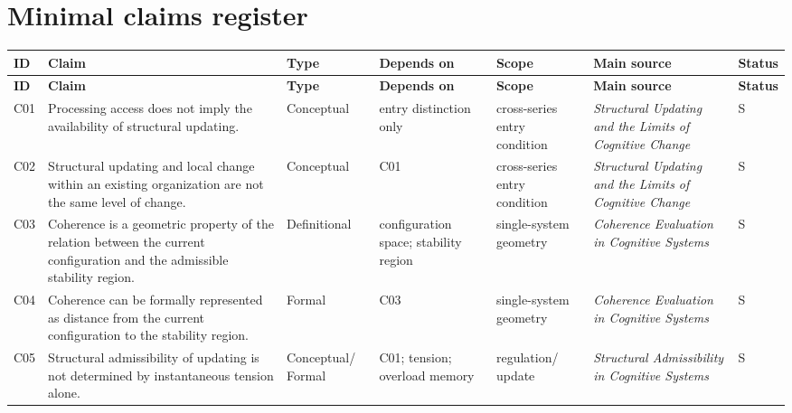 \documentclass[11pt,a4paper]{article}
\begin{document}
	\section{Minimal claims register}
	
	\begin{longtable}{>{\RaggedRight\arraybackslash}p{}
			>{\RaggedRight\arraybackslash}p{}
			>{\RaggedRight\arraybackslash}p{}
			>{\RaggedRight\arraybackslash}p{}
			>{\RaggedRight\arraybackslash}p{}
			>{\RaggedRight\arraybackslash}p{}
			>{\RaggedRight\arraybackslash}p{}}
		\toprule
		\textbf{ID} & \textbf{Claim} & \textbf{Type} & \textbf{Depends on} & \textbf{Scope} & \textbf{Main source} & \textbf{Status} \\
		\midrule
		\endfirsthead
		\toprule
		\textbf{ID} & \textbf{Claim} & \textbf{Type} & \textbf{Depends on} & \textbf{Scope} & \textbf{Main source} & \textbf{Status} \\
		\midrule
		\endhead
		
		C01 & Processing access does not imply the availability of structural updating. & Conceptual & entry distinction only & cross-series entry condition & \emph{Structural Updating and the Limits of Cognitive Change} & S \\
		
		C02 & Structural updating and local change within an existing organization are not the same level of change. & Conceptual & C01 & cross-series entry condition & \emph{Structural Updating and the Limits of Cognitive Change} & S \\
		
		C03 & Coherence is a geometric property of the relation between the current configuration and the admissible stability region. & Definitional & configuration space; stability region & single-system geometry & \emph{Coherence Evaluation in Cognitive Systems} & S \\
		
		C04 & Coherence can be formally represented as distance from the current configuration to the stability region. & Formal & C03 & single-system geometry & \emph{Coherence Evaluation in Cognitive Systems} & S \\
		
		C05 & Structural admissibility of updating is not determined by instantaneous tension alone. & Conceptual/ Formal & C01; tension; overload memory & regulation/ update & \emph{Structural Admissibility in Cognitive Systems} & S \\
		

\end{longtable}
\end{document}
